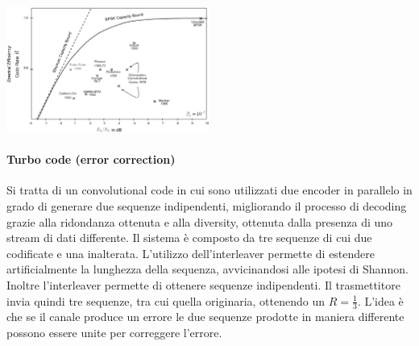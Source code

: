 \begin{center}

\includegraphics[width=0.5\textwidth]{imgs/codes_and_shannon_bound.png}
\end{center}
\paragraph*{Turbo code (error correction)}
\begin{center}
\end{center}
Si tratta di un convolutional code in cui sono utilizzati due encoder in parallelo in grado di generare due sequenze indipendenti, migliorando il processo di decoding grazie alla ridondanza ottenuta e alla diversity, ottenuta dalla presenza di uno stream di dati differente.
Il sistema è composto da tre sequenze di cui due codificate e una inalterata. L'utilizzo dell'interleaver permette di estendere artificialmente la lunghezza della sequenza, avvicinandosi alle ipotesi di Shannon. Inoltre l'interleaver permette di ottenere sequenze indipendenti. 
Il trasmettitore invia quindi tre sequenze, tra cui quella originaria, ottenendo un $R=\frac{1}{3}$. L'idea è che se il canale produce un errore le due sequenze prodotte in maniera differente possono essere unite  per correggere l'errore.
